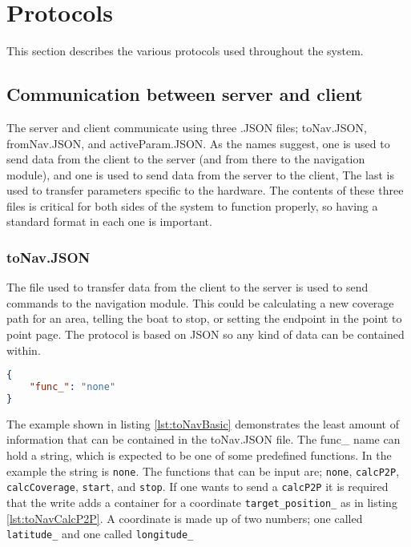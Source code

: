 \section{Protocols}

This section describes the various protocols used throughout the system.

\subsection{Communication between server and client}

The server and client communicate using three .JSON files; toNav.JSON, fromNav.JSON, and activeParam.JSON. As the names suggest, one is used to send data from the client to the server (and from there to the navigation module), and one is used to send data from the server to the client, The last is used to transfer parameters specific to the hardware. The contents of these three files is critical for both sides of the system to function properly, so having a standard format in each one is important. 

\subsubsection{toNav.JSON}

The file used to transfer data from the client to the server is used to send commands to the navigation module. This could be calculating a new coverage path for an area, telling the boat to stop, or setting the endpoint in the point to point page.
The protocol is based on JSON so any kind of data can be contained within.

\begin{lstlisting}[caption = {Example of the least information in the toNav.JSON file}, captionpos=b, label={lst:toNavBasic}, language=json,firstnumber=1]
{
	"func_": "none"
}
\end{lstlisting}

The example shown in listing \ref{lst:toNavBasic} demonstrates the least amount of information that can be contained in the toNav.JSON file. The func_ name can hold a string, which is expected to be one of some predefined functions. In the example the string is \texttt{none}.
The functions that can be input are; \texttt{none}, \texttt{calcP2P}, \texttt{calcCoverage}, \texttt{start}, and \texttt{stop}.
If one wants to send a \texttt{calcP2P} it is required that the write adds a container for a coordinate \texttt{target_position_} as in listing \ref{lst:toNavCalcP2P}. A coordinate is made up of two numbers; one called \texttt{latitude_} and one called \texttt{longitude_}

